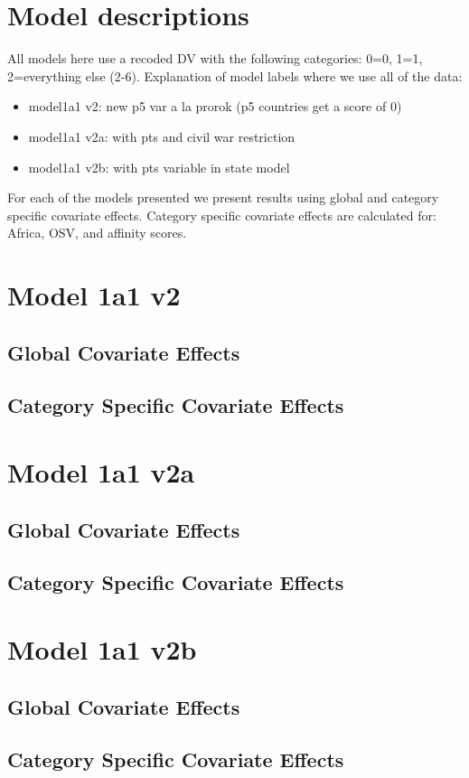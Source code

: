 \documentclass[]{article}
\begin{document}
\tableofcontents

\clearpage

\section{Model descriptions}

All models here use a recoded DV with the following categories: 0=0, 1=1, 2=everything else (2-6). Explanation of model labels where we use all of the data:

\begin{itemize}
	\item model1a1 v2: new p5 var a la prorok (p5 countries get a score of 0)
	\item model1a1 v2a: with pts and civil war restriction
	\item model1a1 v2b: with pts variable in state model
\end{itemize}

For each of the models presented we present results using global and category specific covariate effects. Category specific covariate effects are calculated for: Africa, OSV, and affinity scores.
\clearpage

\section{Model 1a1 v2}
\subsection{Global Covariate Effects}

\clearpage
\subsection{Category Specific Covariate Effects}

\clearpage

\section{Model 1a1 v2a}
\subsection{Global Covariate Effects}

\clearpage
\subsection{Category Specific Covariate Effects}

\clearpage

\section{Model 1a1 v2b}
\subsection{Global Covariate Effects}

\clearpage
\subsection{Category Specific Covariate Effects}

\clearpage
\end{document}
